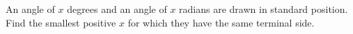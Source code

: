 An angle of $x$ degrees and an angle of $x$ radians are drawn in standard position. Find the smallest positive $x$ for which they have the same terminal side.

